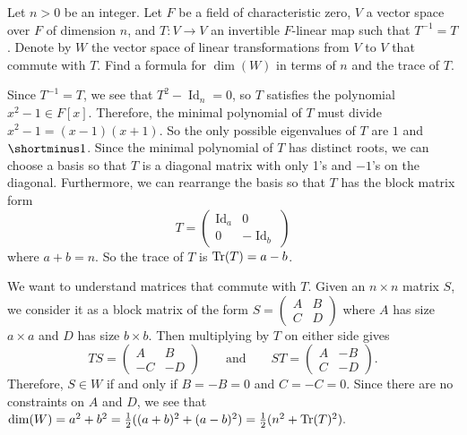 %
\begin{question}[subtitle = January 2017 Problem 2,ID=Jan17_2]
Let $n>0$ be an integer. Let $F$ be a field of characteristic zero, $V$ a vector space over $F$ of dimension $n$, and $T\colon V \to V$ an invertible $F$-linear map such that $T^{-1}=T$. Denote by $W$ the vector space of linear transformations from $V$ to $V$ that commute with $T$. Find a formula for $\dim(W)$ in terms of $n$ and the trace of $T$.
\end{question}
\begin{solution}
Since $T^{-1}=T$, we see that $T^2-\operatorname{Id}_n=0$, so $T$ satisfies the polynomial $x^2-1 \in F[x]$. Therefore, the minimal polynomial of $T$ must divide $x^2-1=(x-1)(x+1)$. So the only possible eigenvalues of $T$ are $1$ and $\shortminus 1$. Since the minimal polynomial of $T$ has distinct roots, we can choose a basis so that $T$ is a diagonal matrix with only 1's and $-1$'s on the diagonal. Furthermore, we can rearrange the basis so that $T$ has the block matrix form
\[T=
\begin{pmatrix}
\operatorname{Id}_a & 0\\
0 & -\operatorname{Id}_b
\end{pmatrix}
\]
where $a+b=n$. So the trace of $T$ is $\operatorname{Tr}(T)=a-b$.

We want to understand matrices that commute with $T$. Given an $n\times n$ matrix $S$, we consider it as a block matrix of the form $S = \begin{pmatrix}
A & B\\
C & D
\end{pmatrix}$
where $A$ has size $a\times a$ and $D$ has size $b\times b$. Then multiplying by $T$ on either side gives
\[TS =
\begin{pmatrix}
A & B\\
-C & -D
\end{pmatrix}
\qquad \text{and} \qquad
ST =
\begin{pmatrix}
A & -B\\
C & -D
\end{pmatrix}.
\]
Therefore, $S \in W$ if and only if $B=-B=0$ and $C=-C=0$. Since there are no constraints on $A$ and $D$, we see that $\dim(W)=a^2+b^2 = \frac{1}{2}((a+b)^2+(a-b)^2)=\frac{1}{2}(n^2+\operatorname{Tr}(T)^2).$
\end{solution}

